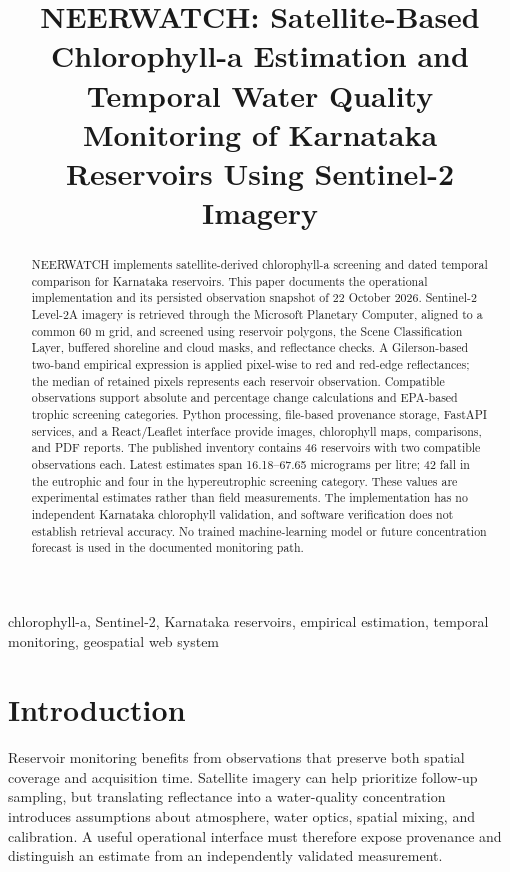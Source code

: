 \documentclass[conference]{IEEEtran}
\begin{document}
\title{NEERWATCH: Satellite-Based Chlorophyll-a Estimation and Temporal Water Quality Monitoring of Karnataka Reservoirs Using Sentinel-2 Imagery}
\author{}
\maketitle
\begin{abstract}
NEERWATCH implements satellite-derived chlorophyll-a screening and dated temporal comparison for Karnataka reservoirs. This paper documents the operational implementation and its persisted observation snapshot of 22 October 2026. Sentinel-2 Level-2A imagery is retrieved through the Microsoft Planetary Computer, aligned to a common 60 m grid, and screened using reservoir polygons, the Scene Classification Layer, buffered shoreline and cloud masks, and reflectance checks. A Gilerson-based two-band empirical expression is applied pixel-wise to red and red-edge reflectances; the median of retained pixels represents each reservoir observation. Compatible observations support absolute and percentage change calculations and EPA-based trophic screening categories. Python processing, file-based provenance storage, FastAPI services, and a React/Leaflet interface provide images, chlorophyll maps, comparisons, and PDF reports. The published inventory contains 46 reservoirs with two compatible observations each. Latest estimates span 16.18--67.65 micrograms per litre; 42 fall in the eutrophic and four in the hypereutrophic screening category. These values are experimental estimates rather than field measurements. The implementation has no independent Karnataka chlorophyll validation, and software verification does not establish retrieval accuracy. No trained machine-learning model or future concentration forecast is used in the documented monitoring path.
\end{abstract}
\begin{IEEEkeywords}
chlorophyll-a, Sentinel-2, Karnataka reservoirs, empirical estimation, temporal monitoring, geospatial web system
\end{IEEEkeywords}
\section{Introduction}
Reservoir monitoring benefits from observations that preserve both spatial coverage and acquisition time. Satellite imagery can help prioritize follow-up sampling, but translating reflectance into a water-quality concentration introduces assumptions about atmosphere, water optics, spatial mixing, and calibration. A useful operational interface must therefore expose provenance and distinguish an estimate from an independently validated measurement.
\end{document}
